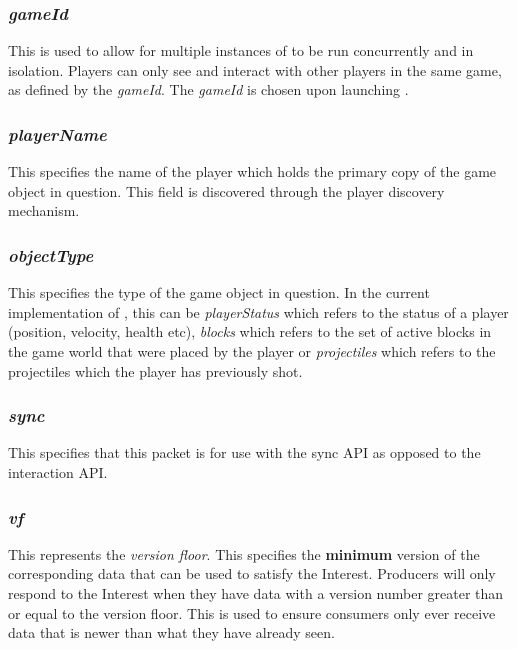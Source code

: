 \subsubsection{\textit{gameId}}
This is used to allow for multiple instances of \game{} to be run concurrently and in isolation. Players can only see and interact with other players in the same game, as defined by the \textit{gameId}. The \textit{gameId} is chosen upon launching \game{}.

\subsubsection{\textit{playerName}}
This specifies the name of the player which holds the primary copy of the game object in question. This field is discovered through the player discovery mechanism.

\subsubsection{\textit{objectType}}
This specifies the type of the game object in question. In the current implementation of \game{}, this can be \textit{playerStatus} which refers to the status of a player (position, velocity, health etc), \textit{blocks} which refers to the set of active blocks in the game world that were placed by the player or \textit{projectiles} which refers to the projectiles which the player has previously shot.

\subsubsection{\textit{sync}}
This specifies that this packet is for use with the sync API as opposed to the interaction API.

\subsubsection{\textit{vf}}
This represents the \textit{version floor}. This specifies the \textbf{minimum} version of the corresponding data that can be used to satisfy the Interest. Producers will only respond to the Interest when they have data with a version number greater than or equal to the version floor. This is used to ensure consumers only ever receive data that is newer than what they have already seen.


